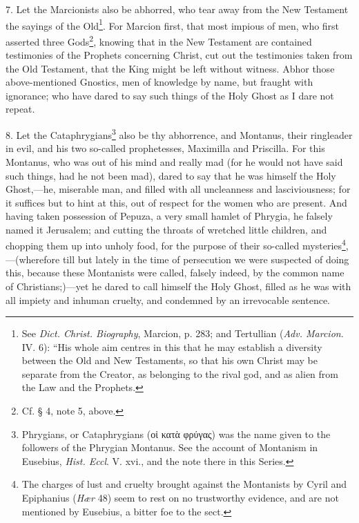 7. Let the Marcionists also be abhorred, who tear away from the New Testament the sayings of the Old\footnote{See \emph{Dict. Christ. Biography}, Marcion, p. 283; and Tertullian (\emph{Adv. Marcion}. IV. 6): “His whole aim centres in this that he may establish a diversity between the Old and New Testaments, so that his own Christ may be separate from the Creator, as belonging to the rival god, and as alien from the Law and the Prophets.}. For Marcion first, that most impious of men, who first asserted three Gods\footnote{Cf. § 4, note 5, above.}, knowing that in the New Testament are contained testimonies of the Prophets concerning Christ, cut out the testimonies taken from the Old Testament, that the King might be left without witness. Abhor those above-mentioned Gnostics, men of knowledge by name, but fraught with ignorance; who have dared to say such things of the Holy Ghost as I dare not repeat.

8. Let the Cataphrygians\footnote{Phrygians, or Cataphrygians (\textgreek{οἱ κατὰ φρύγας}) was the name given to the followers of the Phrygian Montanus. See the account of Montanism in Eusebius, \emph{Hist. Eccl}. V. xvi., and the note there in this Series.} also be thy abhorrence, and Montanus, their ringleader in evil, and his two so-called prophetesses, Maximilla and Priscilla. For this Montanus, who was out of his mind and really mad (for he would not have said such things, had he not been mad), dared to say that he was himself the Holy Ghost,—he, miserable man, and filled with all uncleanness and lasciviousness; for it suffices but to hint at this, out of respect for the women who are present. And having taken possession of Pepuza, a very small hamlet of Phrygia, he falsely named it Jerusalem; and cutting the throats of wretched little children, and chopping them up into unholy food, for the purpose of their so-called mysteries\footnote{The charges of lust and cruelty brought against the Montanists by Cyril and Epiphanius (\emph{Hær} 48) seem to rest on no trustworthy evidence, and are not mentioned by Eusebius, a bitter foe to the sect.},—(wherefore till but lately in the time of persecution we were suspected of doing this, because these Montanists were called, falsely indeed, by the common name of Christians;)—yet he dared to call himself the Holy Ghost, filled as he was with all impiety and inhuman cruelty, and condemned by an irrevocable sentence.

